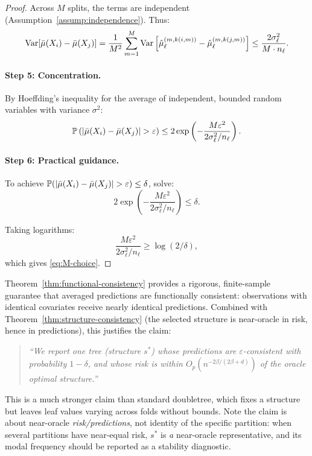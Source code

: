 \documentclass[12pt]{article}
\begin{document}
\begin{proof}
Across $M$ splits, the terms are independent (Assumption~\ref{assump:independence}). Thus:
\[
\operatorname{Var}[\bar{\mu}(X_i) - \bar{\mu}(X_j)] = \frac{1}{M^2} \sum_{m=1}^M \operatorname{Var}\left[\hat{\mu}_\ell^{(m, k(i,m))} - \hat{\mu}_\ell^{(m, k(j,m))}\right] \le \frac{2\sigma^2_\ell}{M \cdot n_\ell}.
\]

\paragraph{Step 5: Concentration.}
By Hoeffding's inequality for the average of independent, bounded random variables with variance $\sigma^2$:
\[
\mathbb{P}\left(|\bar{\mu}(X_i) - \bar{\mu}(X_j)| > \varepsilon\right) \le 2 \exp\left(-\frac{M \varepsilon^2}{2 \sigma^2_\ell / n_\ell}\right).
\]

\paragraph{Step 6: Practical guidance.}
To achieve $\mathbb{P}(|\bar{\mu}(X_i) - \bar{\mu}(X_j)| > \varepsilon) \le \delta$, solve:
\[
2 \exp\left(-\frac{M \varepsilon^2}{2 \sigma^2_\ell / n_\ell}\right) \le \delta.
\]

Taking logarithms:
\[
\frac{M \varepsilon^2}{2 \sigma^2_\ell / n_\ell} \ge \log(2/\delta),
\]
which gives \eqref{eq:M-choice}.
\end{proof}

\begin{remark}
Theorem~\ref{thm:functional-consistency} provides a rigorous, finite-sample guarantee that averaged predictions are functionally consistent: observations with identical covariates receive nearly identical predictions. Combined with Theorem~\ref{thm:structure-consistency} (the selected structure is near-oracle in risk, hence in predictions), this justifies the claim:

\begin{quote}
\textit{``We report one tree (structure $s^*$) whose predictions are $\varepsilon$-consistent with probability $1 - \delta$, and whose risk is within $O_p(n^{-2\beta/(2\beta+d)})$ of the oracle optimal structure.''}
\end{quote}

This is a much stronger claim than standard doubletree, which fixes a structure but leaves leaf values varying across folds without bounds. Note the claim is about near-oracle \emph{risk/predictions}, not identity of the specific partition: when several partitions have near-equal risk, $s^*$ is \emph{a} near-oracle representative, and its modal frequency should be reported as a stability diagnostic.
\end{remark}
\end{document}
